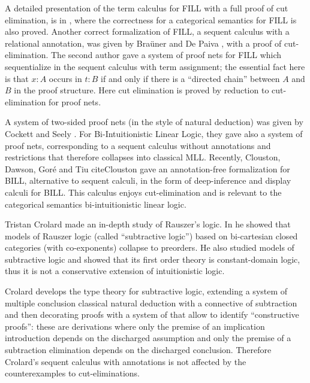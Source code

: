 {A detailed presentation of the term calculus for FILL with a full
proof of cut elimination, is in \cite{EadesDePaiva2016}, where the
correctness for a categorical semantics for FILL is also proved.
Another correct formalization of FILL, a sequent calculus with a
relational annotation, was given by Bra\"uner and De Paiva
\cite{BraunedDePaiva:1997}, with a proof of cut-elimination.  The
second author \cite{Bellin1997} gave a system of proof nets for FILL
which sequentialize in the sequent calculus with term assignment; the
essential fact here is that $x:A$ occurs in $t:B$ if and only if there
is a ``directed chain'' between $A$ and $B$ in the proof
structure. Here cut elimination is proved by reduction to
cut-elimination for proof nets.


A system of two-sided proof nets (in the style of natural deduction)
was given by Cockett and Seely \cite{Cockett:1997}.  For
Bi-Intuitionistic Linear Logic, they gave also a system of proof nets,
corresponding to a sequent calculus without annotations and
restrictions that therefore collapses into classical MLL.  Recently,
Clouston, Dawson, Goré and Tiu cite{Clouston} gave an annotation-free
formalization for BILL, alternative to sequent calculi, in the form of
deep-inference and display calculi for BILL. This calculus enjoys
cut-elimination and is relevant to the categorical semantics
bi-intuitionistic linear logic.
 

Tristan Crolard \cite{Crolard:2001,Crolard:2004} made an in-depth study of Rauszer's logic. In \cite{Crolard:2001} he showed that models of Rauszer logic (called ``subtractive logic'') based on bi-cartesian closed categories (with co-exponents) collapse to preorders.
He also studied models of subtractive logic and showed that its first order theory is constant-domain logic, thus it is not 
a conservative extension of intuitionistic logic.

Crolard \cite{Crolard:2004} develops the type theory for subtractive logic, extending a system of multiple conclusion
classical natural deduction with a connective of subtraction and then decorating proofs with a system of \cite{annotations
of dependencies} that allow to identify ``constructive proofs'': these are derivations where only the premise of an implication introduction depends on the discharged assumption and only the premise of a subtraction elimination depends on the discharged conclusion. Therefore Crolard's sequent calculus with annotations is not affected by the 
counterexamples to cut-eliminations. 

}
